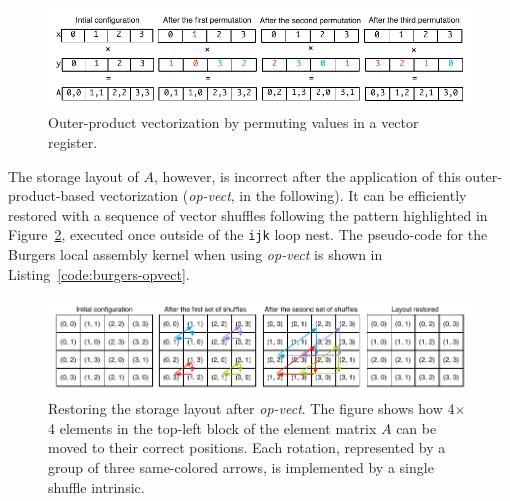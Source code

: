 \begin{figure}
\centerline{\includegraphics[scale=0.6]{lowlevelopt/pictures/vect-by-vect-inline.pdf}}
\caption{Outer-product vectorization by permuting values in a vector register.}
\label{fig:vect-by-vect}
\end{figure}

The storage layout of $A$, however, is incorrect after the application of this outer-product-based vectorization (\emph{op-vect}, in the following). It can be efficiently restored with a sequence of vector shuffles following the pattern highlighted in Figure~\ref{fig:restore-layout}, executed once outside of the \texttt{ijk} loop nest. The pseudo-code for the Burgers local assembly kernel when using \emph{op-vect} is shown in Listing~\ref{code:burgers-opvect}.

\begin{figure}
\centerline{\includegraphics[scale=0.6]{lowlevelopt/pictures/vect-restore-inline.pdf}}
\caption{Restoring the storage layout after \emph{op-vect}. The figure shows how 4$\times$4 elements in the top-left block of the element matrix $A$ can be moved to their correct positions. Each rotation, represented by a group of three same-colored arrows, is implemented by a single shuffle intrinsic.}
\label{fig:restore-layout}
\end{figure}

